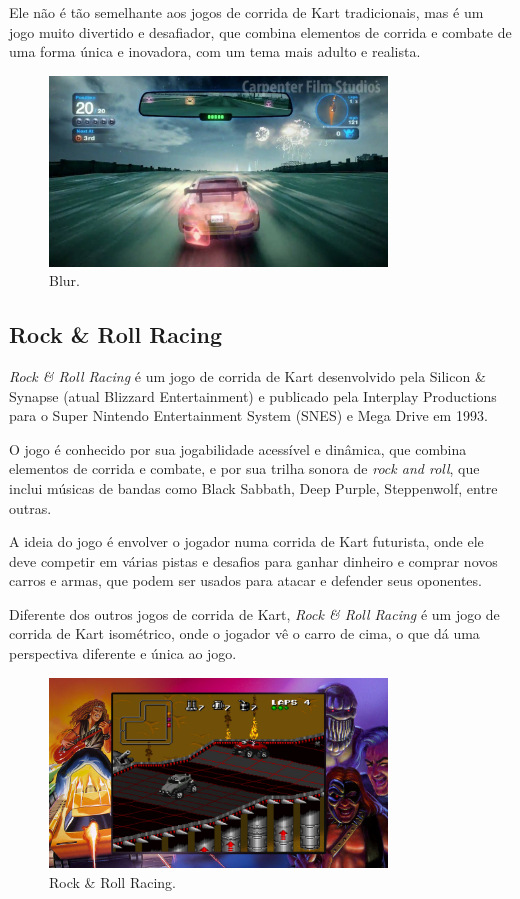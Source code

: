 Ele não é tão semelhante aos jogos de corrida de Kart tradicionais, mas é um jogo muito divertido e desafiador, que combina elementos de corrida e combate de uma forma única e inovadora, com um tema mais adulto e realista.

\begin{figure}[H]
    \centering
    \includegraphics[width=0.8\textwidth]{figuras/Blur.jpg}
    \caption{Blur. \cite{blur}}
    \label{fig:blur}
\end{figure}

\subsection{Rock \& Roll Racing}

\textit{Rock \& Roll Racing} é um jogo de corrida de Kart desenvolvido pela Silicon \& Synapse (atual Blizzard Entertainment) e publicado pela Interplay Productions para o Super Nintendo Entertainment System (SNES) e Mega Drive em 1993.

O jogo é conhecido por sua jogabilidade acessível e dinâmica, que combina elementos de corrida e combate, e por sua trilha sonora de \textit{rock and roll}, que inclui músicas de bandas como Black Sabbath, Deep Purple, Steppenwolf, entre outras.

A ideia do jogo é envolver o jogador numa corrida de Kart futurista, onde ele deve competir em várias pistas e desafios para ganhar dinheiro e comprar novos carros e armas, que podem ser usados para atacar e defender seus oponentes.

Diferente dos outros jogos de corrida de Kart, \textit{Rock \& Roll Racing} é um jogo de corrida de Kart isométrico, onde o jogador vê o carro de cima, o que dá uma perspectiva diferente e única ao jogo.

\begin{figure}[H]
    \centering
    \includegraphics[width=0.8\textwidth]{figuras/Rock and Roll Racing.jpg}
    \caption{Rock \& Roll Racing. \cite{rockAndRollRacing}}
    \label{fig:rock-and-roll-racing}
\end{figure}

